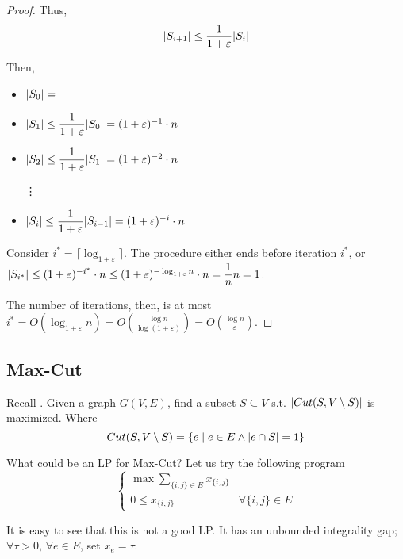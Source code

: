 \begin{proof}
        Thus,
        \[ \vert S_{i+1} \vert \leq \dfrac{1}{1 + \varepsilon} \vert S_i \vert \]

        Then,
        \begin{itemize}
            \item $\vert S_0 \vert = $
            \item $\vert S_1 \vert \leq \dfrac{1}{1 + \varepsilon} \vert S_0 \vert = (1+\varepsilon)^{-1} \cdot n$
            \item $\vert S_2 \vert \leq \dfrac{1}{1 + \varepsilon} \vert S_1 \vert = (1+\varepsilon)^{-2} \cdot n$
            \item[\vdots]
            \item $\vert S_i \vert \leq \dfrac{1}{1 + \varepsilon} \vert S_{i-1} \vert = (1+\varepsilon)^{-i} \cdot n$
        \end{itemize}

        Consider $i^* = \lceil \log_{1+\varepsilon} \rceil$. The procedure either ends before iteration $i^*$, or $\vert S_{i^*} \vert \leq (1+\varepsilon)^{-i^*} \cdot n \leq (1+\varepsilon)^{- \log _{1+\varepsilon} n} \cdot n = \dfrac{1}{n} n = 1$.

        The number of iterations, then, is at most $i^* = O(\log_{1+\varepsilon} n) = O(\frac{\log n}{\log(1+\varepsilon)}) = O(\frac{\log n}{\varepsilon})$.
    \end{proof}


\subsection{Max-Cut}
    Recall .
    Given a graph $G(V,E)$, find a subset $S \subseteq V$ s.t. $\vert Cut(S, V \setminus S) \vert$ is maximized.
    Where
    \[ Cut(S, V \setminus S) = \{ e \; \vert \; e \in E \wedge \vert e \cap S \vert = 1 \} \]

    What could be an LP for Max-Cut? Let us try the following program
    \begin{equation}
        \begin{cases}
            \max \sum_{\{i,j\} \in E} x_{\{i,j\}}\\
            0 \leq x_{\{i,j\}} & \forall \{i,j\} \in E
        \end{cases}
    \end{equation}

    It is easy to see that this is not a good LP.\@
    It has an unbounded integrality gap; $\forall \tau > 0$, $\forall e \in E$, set $x_e = \tau$.

